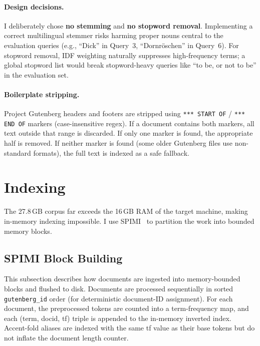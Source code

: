 \documentclass[sigconf,nonacm]{acmart}
\begin{document}
\paragraph{Design decisions.}
I deliberately chose \textbf{no stemming} and \textbf{no stopword removal}.
Implementing a correct multilingual stemmer risks harming proper nouns central
to the evaluation queries (e.g., ``Dick'' in Query~3, ``Dornr\"oschen'' in
Query~6).  For stopword removal, IDF weighting naturally suppresses
high-frequency terms; a global stopword list would break stopword-heavy queries
like ``to be, or not to be'' in the evaluation set.

\paragraph{Boilerplate stripping.}
Project Gutenberg headers and footers are stripped using
\texttt{*** START OF} / \texttt{*** END OF} markers (case-insensitive regex).
If a document contains both markers, all text outside that range is discarded.
If only one marker is found, the appropriate half is removed.  If neither
marker is found (some older Gutenberg files use non-standard formats), the
full text is indexed as a safe fallback.

\section{Indexing}

The 27.8\,GB corpus far exceeds the 16\,GB RAM of the target machine,
making in-memory indexing impossible.  I use SPIMI~\cite{heinz2003spimi} to
partition the work into bounded memory blocks.

\subsection{SPIMI Block Building}
This subsection describes how documents are ingested into memory-bounded
blocks and flushed to disk.
Documents are processed sequentially in sorted \texttt{gutenberg\_id} order
(for deterministic document-ID assignment).  For each document, the
preprocessed tokens are counted into a term-frequency map, and each
(term, docid, tf) triple is appended to the in-memory inverted index.
Accent-fold aliases are indexed with the same tf value as their base tokens but
do not inflate the document length counter.
\end{document}
